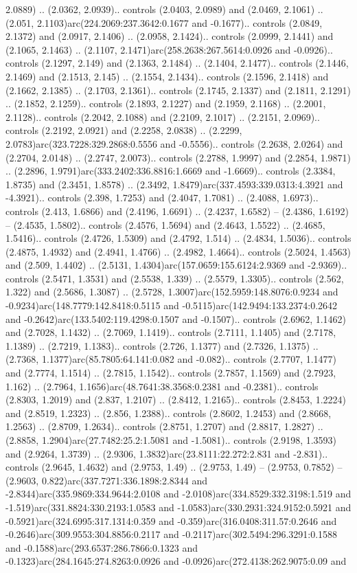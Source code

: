 2.0889) .. (2.0362, 2.0939).. controls (2.0403, 2.0989) and (2.0469, 2.1061) .. (2.051, 2.1103)arc(224.2069:237.3642:0.1677 and -0.1677).. controls (2.0849, 2.1372) and (2.0917, 2.1406) .. (2.0958, 2.1424).. controls (2.0999, 2.1441) and (2.1065, 2.1463) .. (2.1107, 2.1471)arc(258.2638:267.5614:0.0926 and -0.0926).. controls (2.1297, 2.149) and (2.1363, 2.1484) .. (2.1404, 2.1477).. controls (2.1446, 2.1469) and (2.1513, 2.145) .. (2.1554, 2.1434).. controls (2.1596, 2.1418) and (2.1662, 2.1385) .. (2.1703, 2.1361).. controls (2.1745, 2.1337) and (2.1811, 2.1291) .. (2.1852, 2.1259).. controls (2.1893, 2.1227) and (2.1959, 2.1168) .. (2.2001, 2.1128).. controls (2.2042, 2.1088) and (2.2109, 2.1017) .. (2.2151, 2.0969).. controls (2.2192, 2.0921) and (2.2258, 2.0838) .. (2.2299, 2.0783)arc(323.7228:329.2868:0.5556 and -0.5556).. controls (2.2638, 2.0264) and (2.2704, 2.0148) .. (2.2747, 2.0073).. controls (2.2788, 1.9997) and (2.2854, 1.9871) .. (2.2896, 1.9791)arc(333.2402:336.8816:1.6669 and -1.6669).. controls (2.3384, 1.8735) and (2.3451, 1.8578) .. (2.3492, 1.8479)arc(337.4593:339.0313:4.3921 and -4.3921).. controls (2.398, 1.7253) and (2.4047, 1.7081) .. (2.4088, 1.6973).. controls (2.413, 1.6866) and (2.4196, 1.6691) .. (2.4237, 1.6582) -- (2.4386, 1.6192) -- (2.4535, 1.5802).. controls (2.4576, 1.5694) and (2.4643, 1.5522) .. (2.4685, 1.5416).. controls (2.4726, 1.5309) and (2.4792, 1.514) .. (2.4834, 1.5036).. controls (2.4875, 1.4932) and (2.4941, 1.4766) .. (2.4982, 1.4664).. controls (2.5024, 1.4563) and (2.509, 1.4402) .. (2.5131, 1.4304)arc(157.0659:155.6124:2.9369 and -2.9369).. controls (2.5471, 1.3531) and (2.5538, 1.339) .. (2.5579, 1.3305).. controls (2.562, 1.322) and (2.5686, 1.3087) .. (2.5728, 1.3007)arc(152.5959:148.8076:0.9234 and -0.9234)arc(148.7779:142.8418:0.5115 and -0.5115)arc(142.9494:133.2374:0.2642 and -0.2642)arc(133.5402:119.4298:0.1507 and -0.1507).. controls (2.6962, 1.1462) and (2.7028, 1.1432) .. (2.7069, 1.1419).. controls (2.7111, 1.1405) and (2.7178, 1.1389) .. (2.7219, 1.1383).. controls (2.726, 1.1377) and (2.7326, 1.1375) .. (2.7368, 1.1377)arc(85.7805:64.141:0.082 and -0.082).. controls (2.7707, 1.1477) and (2.7774, 1.1514) .. (2.7815, 1.1542).. controls (2.7857, 1.1569) and (2.7923, 1.162) .. (2.7964, 1.1656)arc(48.7641:38.3568:0.2381 and -0.2381).. controls (2.8303, 1.2019) and (2.837, 1.2107) .. (2.8412, 1.2165).. controls (2.8453, 1.2224) and (2.8519, 1.2323) .. (2.856, 1.2388).. controls (2.8602, 1.2453) and (2.8668, 1.2563) .. (2.8709, 1.2634).. controls (2.8751, 1.2707) and (2.8817, 1.2827) .. (2.8858, 1.2904)arc(27.7482:25.2:1.5081 and -1.5081).. controls (2.9198, 1.3593) and (2.9264, 1.3739) .. (2.9306, 1.3832)arc(23.8111:22.272:2.831 and -2.831).. controls (2.9645, 1.4632) and (2.9753, 1.49) .. (2.9753, 1.49) -- (2.9753, 0.7852) -- (2.9603, 0.822)arc(337.7271:336.1898:2.8344 and -2.8344)arc(335.9869:334.9644:2.0108 and -2.0108)arc(334.8529:332.3198:1.519 and -1.519)arc(331.8824:330.2193:1.0583 and -1.0583)arc(330.2931:324.9152:0.5921 and -0.5921)arc(324.6995:317.1314:0.359 and -0.359)arc(316.0408:311.57:0.2646 and -0.2646)arc(309.9553:304.8856:0.2117 and -0.2117)arc(302.5494:296.3291:0.1588 and -0.1588)arc(293.6537:286.7866:0.1323 and -0.1323)arc(284.1645:274.8263:0.0926 and -0.0926)arc(272.4138:262.9075:0.09 and 